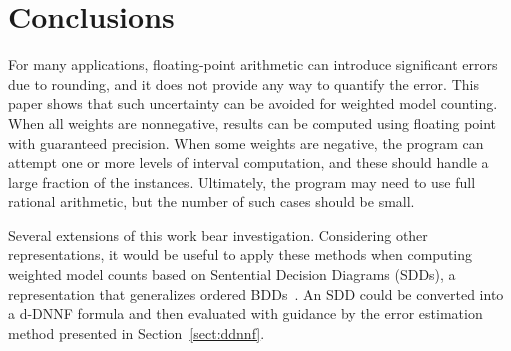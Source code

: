 \documentclass[letterpaper,USenglish,cleveref, autoref, thm-restate]{lipics-v2021}
\begin{document}


\section{Conclusions}
\label{sect:conclusion}

For many applications, floating-point arithmetic can introduce
significant errors due to rounding, and it does not provide any way to quantify the error.
This
paper shows that such uncertainty can be avoided for weighted model
counting.  When all weights are nonnegative, results can be computed
using floating point with guaranteed precision.  When some weights
are negative, the program can attempt one or more levels of interval
computation, and these should handle a large fraction of the instances.  Ultimately,
the program may need to use full rational arithmetic, but the number
of such cases should be small.

Several extensions of this work bear investigation.  Considering other representations,
it would be useful to apply these methods when computing weighted model counts based on 
Sentential Decision Diagrams (SDDs), a representation that generalizes ordered BDDs~\cite{darwiche:ijcai:2011}.
An SDD could be converted into a d-DNNF formula and then evaluated with guidance by the error estimation method presented in Section~\ref{sect:ddnnf}.
\end{document}
